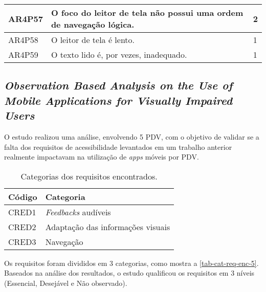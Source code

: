 \begin{table}[htb]
\begin{center}
\begin{tabular}{p{1.2cm}|p{12.0cm}|p{1.4cm}}
      \hline
      AR4P57          & O foco do leitor de tela não possui uma ordem de navegação lógica.                                & 2                 \\
      \hline
      AR4P58          & O leitor de tela é lento.                                                                         & 1                 \\
      \hline
      AR4P59          & O texto lido é, por vezes, inadequado.                                                            & 1                 \\
    \end{tabular}
  \end{center}
\end{table}

\subsection{\emph{Observation Based Analysis on the Use of Mobile Applications for Visually Impaired Users}}

O estudo realizou uma análise, envolvendo 5 PDV, com o objetivo de validar se a falta dos requisitos de acessibilidade levantados
em um trabalho anterior realmente impactavam na utilização de \emph{apps} móveis por PDV\@.

\begin{table}[htb]
  \begin{center}
    \ABNTEXfontereduzida
    \caption{Categorias dos requisitos encontrados.}
    \label{tab-cat-req-enc-5}
    \begin{tabular}{p{2.0cm}|p{5.0cm}}
      \textbf{Código} & \textbf{Categoria}                \\
      \hline
      CRED1           & \emph{Feedbacks} audíveis         \\
      \hline
      CRED2           & Adaptação das informações visuais \\
      \hline
      CRED3           & Navegação                         \\
    \end{tabular}
  \end{center}
\end{table}

Os requisitos foram divididos em 3 categorias, como mostra a \autoref{tab-cat-req-enc-5}.
Baseados na análise dos resultados, o estudo qualificou os requisitos em 3 níveis (Essencial, Desejável e Não observado).

